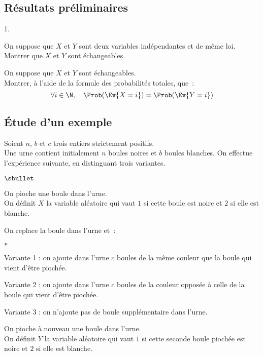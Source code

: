 \documentclass[11pt]{article}%
\begin{document}
\subsection*{Résultats préliminaires}

\begin{noliste}{1.}
\setlength{\itemsep}{2mm}
\item On suppose que $X$ et $Y$ sont deux variables indépendantes et de 
même loi.\\
Montrer que $X$ et $Y$ sont échangeables.




\item On suppose que $X$ et $Y$ sont échangeables.\\
  Montrer, à l'aide de la formule des probabilités totales, que~:
  \[ 
  \forall i \in \N, \quad \Prob(\Ev{X=i}) = \Prob(\Ev{Y=i}) 
  \]
  
  
  
\end{noliste}




\subsection*{\'Etude d'un exemple}

\noindent
Soient $n$, $b$ et $c$ trois entiers strictement positifs.\\
Une urne contient initialement $n$ boules noires et $b$ boules
blanches. On effectue l'expérience suivante, en distinguant trois
variantes.

\begin{noliste}{$\sbullet$}
\item On pioche une boule dans l'urne. \\
  On définit $X$ la variable aléatoire qui vaut $1$ si cette boule est
  noire et $2$ si elle est blanche.
  
\item On replace la boule dans l'urne et~:
  \begin{noliste}{$\star$}
  \item Variante 1 : on ajoute dans l'urne $c$ boules de la même 
    couleur que la boule qui vient d'être piochée.
    
  \item Variante 2 : on ajoute dans l'urne $c$ boules de la 
    couleur opposée à celle de la boule qui vient d'être piochée.
    
  \item Variante 3 : on n'ajoute pas de boule supplémentaire 
    dans l'urne.
  \end{noliste}
  
\item On pioche à nouveau une boule dans l'urne.\\
  On définit $Y$ la variable aléatoire qui vaut $1$ si cette seconde 
  boule piochée est noire et $2$ si elle est blanche.
\end{noliste}
\end{document}
